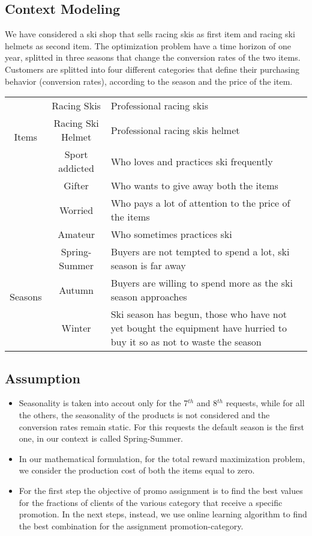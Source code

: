 \subsection*{Context Modeling}
We have considered a ski shop that sells racing skis as first item and racing ski helmets as second item. The optimization problem have a time horizon of one year, splitted in three seasons that change the conversion rates of the two items. Customers are splitted into four different categories that define their purchasing behavior (conversion rates), according to the season and the price of the item.

\begin{center}
	\begin{tabular}{ |c|c|p{9cm}| } 
	\hline
	\multirow{3}{4em}{Items} & Racing Skis & Professional racing skis \\ 
	& Racing Ski Helmet &  Professional racing skis helmet\\ 
	\hline
	\multirow{3}{4em}{Customer categories} & Sport addicted & Who loves and practices ski frequently\\ 
	& Gifter &  Who wants to give away both the items\\
	& Worried &  Who pays a lot of attention to the price of the items\\ 
	& Amateur &  Who sometimes practices ski\\ 
	\hline
	\multirow{3}{4em}{Seasons} & Spring-Summer & Buyers are not tempted to spend a lot, ski season is far away\\ 
	& Autumn & Buyers are willing to spend more as the ski season approaches \\
	& Winter &  Ski season has begun, those who have not yet bought the equipment have hurried to buy it so as not to waste the season\\  
	\hline
	\end{tabular}
	\end{center}

\subsection*{Assumption}
\begin{itemize}
		\item Seasonality is taken into accout only for the 7$^{th}$ and 8$^{th}$ requests, while for all the others, the seasonality of the products is not considered and the conversion rates remain static. For this requests the default season is the first one, in our context is called Spring-Summer.  
		\item In our mathematical formulation, for the total reward maximization problem, we consider the production cost of both the items equal to zero.
		\item For the first step the objective of promo assignment is to find the best values for the fractions of clients of the various category that receive a specific promotion. In the next steps, instead, we use online learning algorithm to find the best combination for the assignment promotion-category.
	\end{itemize}